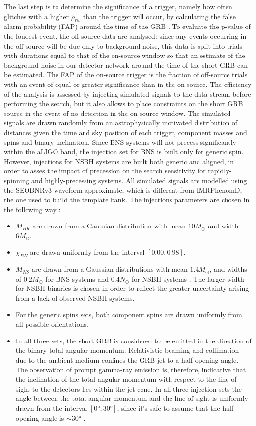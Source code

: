 \documentclass[binding=0.6cm, LaM]{sapthesis}
\begin{document}
	The last step is to determine the significance of a trigger,
	namely how often glitches with a higher $\rho_{rw}$ than the trigger will occur,
	by calculating the false alarm probability (FAP) around the time of the GRB \cite{46}.
	To evaluate the p-value of the loudest event, the off-source data are analysed:
	since any events occurring in the off-source will be due only to background noise, 
	this data is split into trials with durations equal to that of the on-source window 
	so that an estimate of the background noise in our detector network around the time of the short GRB can be estimated.
	The FAP of the on-source trigger is the fraction of off-source trials with an event of equal or greater significance than in the on-source. 
        The efficiency of the analysis is assessed by injecting simulated signals to the data stream before performing the search,
 	but it also allows to place constraints on the short GRB source in the event of no detection in the on-source window. 
        The simulated signals are drawn randomly from an astrophysically motivated distribution of distances given the time and sky position of each trigger, 
	component masses and spins and binary inclination. 
	Since BNS systems will not precess significantly within the aLIGO band, the injection set for BNS is built only for generic spin.
	However, injections for NSBH systems are built both generic and aligned,
	in order to asses the impact of precession on the search sensitivity for rapidly-spinning and highly-precessing systems.
	All simulated signals are modelled using the SEOBNRv3 waveform approximate, which is different from IMRPhenomD,
	the one used to build the template bank. 
	The injections parameters are chosen in the following way \cite{136}:
		\begin{itemize}
			\item $M_{BH}$ are drawn from a Gaussian distribution with mean $10M_\odot$ and width $6M_\odot$.
			\item $\chi_{BH}$ are drawn uniformly from the interval $[0.00, 0.98]$.
			\item $M_{NS}$ are drawn from a Gaussian distributions with mean $1.4M_\odot$, 
				 and widths of $0.2M_\odot$ for BNS systems and $0.4N_\odot$ for NSBH systems \cite{}. 
				 The larger width for NSBH binaries is chosen in order to reflect the greater uncertainty arising from a lack of observed NSBH systems. 
			\item For the generic spins sets, both component spins are drawn uniformly from all possible orientations. 
			\item In all three sets, the short GRB is considered to be emitted in the direction of the binary total angular momentum. 
				 Relativistic beaming and collimation due to the ambient medium confines the GRB jet to a half-opening angle. 
				 The observation of prompt gamma-ray emission is, therefore, indicative that the inclination of the total angular momentum 
				 with respect to the line of sight to the detectors lies within the jet cone. 
				 In all three injection sets the angle between the total angular momentum and the line-of-sight is uniformly drawn from the interval $[\ang{0}, \ang{30}]$,
				 since it’s safe to assume that the half-opening angle is $\sim \ang{30}$ \cite{}.
		\end{itemize}
\end{document}
